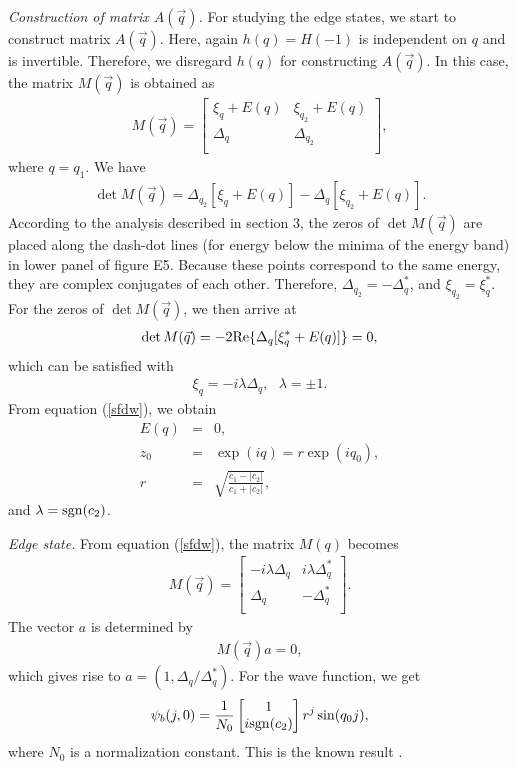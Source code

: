 \documentclass[aps,pra,amsmath,twocolumn,showpacs,bibnotes,10pt]{revtex4-1}
\begin{document}
{\it Construction of matrix $A(\vec q)$.} For studying the edge states, we start to construct matrix $A(\vec q)$. Here, again $h(q) = H(-1)$ is independent on $q$ and is invertible. Therefore, we disregard $h(q)$ for constructing $A(\vec q)$. In this case, the matrix $M(\vec q)$ is obtained as
\begin{eqnarray}
M(\vec q) = \begin{bmatrix}
	\xi_q+E(q)&\xi_{q_2}+E(q)\\
	\Delta_q&\Delta_{q_2}\\
\end{bmatrix}, \nonumber
\end{eqnarray}
where $q = q_1$. We have
\begin{eqnarray}
\det M(\vec q) =\Delta_{q_2}[\xi_q+E(q)]-\Delta_{q}[\xi_{q_2}+E(q)]. \nonumber
\end{eqnarray}
According to the analysis described in section 3, the zeros of $\det M(\vec q)$ are placed along the dash-dot lines (for energy below the minima of the energy band) in lower panel of figure E5. Because these points correspond to the same energy, they are complex conjugates of each other. Therefore, $\Delta_{q_2} = - \Delta^{\ast}_{q}$, and $\xi_{q_2} = \xi^{\ast}_{q}$. For the zeros of $\det M(\vec q)$, we then arrive at
\begin{eqnarray}
\det M(\vec q) =-2{\rm Re}\{\Delta_{q}[\xi^{\ast}_{q}+E(q)]\} = 0, \nonumber
\end{eqnarray}
which can be satisfied with
\begin{eqnarray}
\xi_{q} =-i\lambda\Delta_{q}, ~~~\lambda = \pm 1.\label{sfdw}
\end{eqnarray}
From equation (\ref{sfdw}), we obtain
\begin{eqnarray}
E(q) &=& 0,  \nonumber\\
z_0 &=&\exp(iq)= r\exp(iq_0) ,\nonumber\\
r &=& \sqrt{\frac{c_1-|c_2|}{c_1+|c_2|}} ,\label{zrdw}
\end{eqnarray}
and $\lambda = {\rm sgn} (c_2)$. 

{\it Edge state.} From equation (\ref{sfdw}), the matrix $M(q)$ becomes
\begin{eqnarray}
M(\vec q) = \begin{bmatrix}
	-i\lambda\Delta_q&i\lambda\Delta^{\ast}_q\\
	\Delta_q&-\Delta^{\ast}_{q}\\
\end{bmatrix}. \nonumber
\end{eqnarray}
The vector $a$ is determined by 
\begin{eqnarray}
M(\vec q)a = 0, \nonumber
\end{eqnarray}
which gives rise to $a = (1,\Delta_q/\Delta^{\ast}_{q})$. For the wave function, we get
\begin{eqnarray}
\psi_b(j,0) = \frac{1}{N_0}\begin{bmatrix}
	1\\
	i{\rm sgn} (c_2)\\
\end{bmatrix}r^j\sin(q_0j), \label{wvfdw}
\end{eqnarray}
where $N_0$ is a normalization constant. This is the known result \cite{Yan1}.
\end{document}
